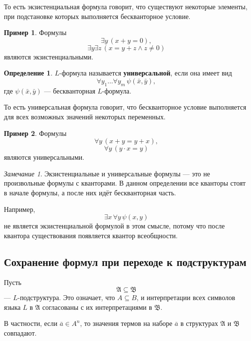 \documentclass[12pt,a4paper,oneside,openany]{book}
\theoremstyle{definition}
\newtheorem{definition}{Определение}[chapter]
\newtheorem{example}{Пример}[chapter]
\theoremstyle{plain}
\theoremstyle{remark}
\newtheorem{remark}{Замечание}[chapter]
\begin{document}
То есть экзистенциальная формула говорит, что существуют некоторые элементы, при подстановке которых выполняется бескванторное условие.

\begin{example}
Формулы
\[
\exists y\,(x+y=0),
\]
\[
\exists y\exists z\,(x=y+z\wedge z\ne0)
\]
являются экзистенциальными.
\end{example}

\begin{definition}
$L$-формула называется \textbf{универсальной}, если она имеет вид
\[
\forall y_1\ldots \forall y_m\,\psi(\bar x,\bar y),
\]
где $\psi(\bar x,\bar y)$ — бескванторная $L$-формула.
\end{definition}

То есть универсальная формула говорит, что бескванторное условие выполняется для всех возможных значений некоторых переменных.

\begin{example}
Формулы
\[
\forall y\,(x+y=y+x),
\]
\[
\forall y\,(y\cdot x=y)
\]
являются универсальными.
\end{example}

\begin{remark}
Экзистенциальные и универсальные формулы — это не произвольные формулы с кванторами. В данном определении все кванторы стоят в начале формулы, а после них идёт бескванторная часть.

Например,
\[
\exists x\,\forall y\,\psi(x,y)
\]
не является экзистенциальной формулой в этом смысле, потому что после квантора существования появляется квантор всеобщности.
\end{remark}

\subsection{Сохранение формул при переходе к подструктурам}

Пусть
\[
\mathfrak A\subseteq \mathfrak B
\]
— $L$-подструктура. Это означает, что $A\subseteq B$, и интерпретации всех символов языка $L$ в $\mathfrak A$ согласованы с их интерпретациями в $\mathfrak B$.

В частности, если $\bar a\in A^n$, то значения термов на наборе $\bar a$ в структурах $\mathfrak A$ и $\mathfrak B$ совпадают.
\end{document}
